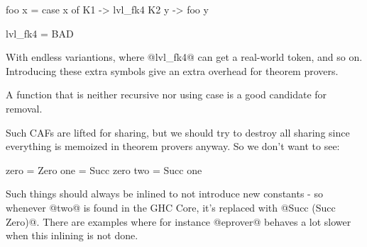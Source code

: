 \begin{code}
foo x = case x of
    K1 -> lvl_fk4
    K2 y -> foo y

lvl_fk4 = BAD
\end{code}

With endless variantions, where @lvl_fk4@ can get a real-world token,
and so on. Introducing these extra symbols give an extra overhead for
theorem provers.

A function that is neither recursive nor using case is a good
candidate for removal.

Such CAFs are lifted for sharing, but we should try to destroy all
sharing since everything is memoized in theorem provers anyway. So we
don't want to see:

\begin{code}
zero = Zero
one = Succ zero
two = Succ one
\end{code}

Such things should always be inlined to not introduce new constants -
so whenever @two@ is found in the GHC Core, it's replaced with
@Succ (Succ Zero)@.
There are examples where for instance @eprover@ behaves a lot slower
when this inlining is not done.
